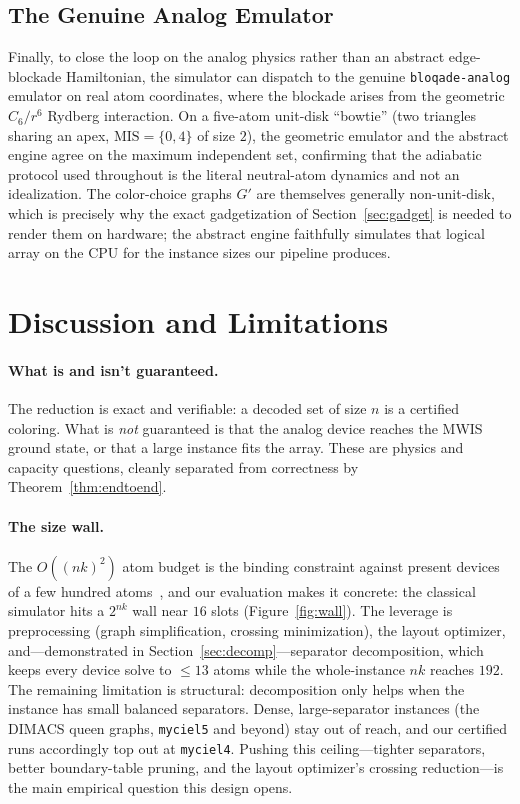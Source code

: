 \documentclass[11pt]{article}
\theoremstyle{definition}
\theoremstyle{remark}
\newcommand{\MIS}{\mathrm{MIS}}
\begin{document}
\subsection{The Genuine Analog Emulator}
\label{sec:bloqade}

Finally, to close the loop on the analog physics rather than an abstract
edge-blockade Hamiltonian, the simulator can dispatch to the genuine
\texttt{bloqade-analog} emulator on real atom coordinates, where the blockade
arises from the geometric $C_6/r^6$ Rydberg interaction. On a five-atom unit-disk
``bowtie'' (two triangles sharing an apex, $\MIS=\{0,4\}$ of size $2$), the
geometric emulator and the abstract engine agree on the maximum independent set,
confirming that the adiabatic protocol used throughout is the literal neutral-atom
dynamics and not an idealization. The color-choice graphs $G'$ are themselves
generally non-unit-disk, which is precisely why the exact gadgetization of
Section~\ref{sec:gadget} is needed to render them on hardware; the abstract engine
faithfully simulates that logical array on the CPU for the instance sizes our
pipeline produces.

\section{Discussion and Limitations}
\label{sec:discussion}

\paragraph{What is and isn't guaranteed.} The reduction is exact and verifiable:
a decoded set of size $n$ is a certified coloring. What is \emph{not} guaranteed is
that the analog device reaches the MWIS ground state, or that a large instance fits
the array. These are physics and capacity questions, cleanly separated from
correctness by Theorem~\ref{thm:endtoend}.

\paragraph{The size wall.} The $O((nk)^2)$ atom budget is the binding constraint
against present devices of a few hundred atoms~\cite{Wurtz2023}, and our evaluation
makes it concrete: the classical simulator hits a $2^{nk}$ wall near $16$ slots
(Figure~\ref{fig:wall}). The leverage is preprocessing (graph simplification,
crossing minimization), the layout optimizer, and---demonstrated in
Section~\ref{sec:decomp}---separator decomposition, which keeps every device solve
to $\le 13$ atoms while the whole-instance $nk$ reaches $192$. The remaining
limitation is structural: decomposition only helps when the instance has small
balanced separators. Dense, large-separator instances (the DIMACS queen graphs,
\texttt{myciel5} and beyond) stay out of reach, and our certified runs accordingly
top out at \texttt{myciel4}. Pushing this ceiling---tighter separators, better
boundary-table pruning, and the layout optimizer's crossing reduction---is the main
empirical question this design opens.
\end{document}
